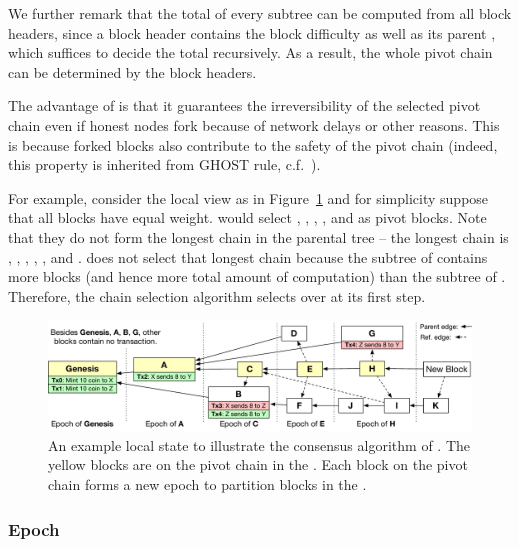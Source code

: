 We further remark that the total  of every subtree can be computed from all block headers, 
since a block header contains the block difficulty as well as its parent , which suffices to decide  the total  recursively.
As a result, the whole pivot chain can be determined by the block headers.


The advantage of  is that it guarantees the
irreversibility of the selected pivot chain even if honest nodes fork because of network delays or other reasons.
This is because forked blocks also contribute
to the safety of the pivot chain (indeed, this property is inherited from GHOST rule, c.f.~\cite{GHOST}).

For example, consider the local view as in Figure~\ref{fig:example} and for simplicity suppose that all blocks have equal weight. 
{\name} would select , ,
, , and  as pivot blocks. 
Note that they do not form the longest chain in the parental tree -- the longest chain is
, , , , , and . 
{\name} does not select that longest chain because the subtree of
 contains more blocks (and hence more total amount of computation) than the subtree of . 
Therefore, the chain selection algorithm selects  over  at its first step.

\begin{figure}
	\centering
	\includegraphics[scale=0.52]{figs/example}
	\caption{An example local \tg state to illustrate the consensus algorithm of
		{\name}. The yellow blocks are on the pivot chain in the \tg. 
		Each block on the pivot chain forms a new epoch to partition
		blocks in the \tg.}
	\label{fig:example}
\end{figure}




\subsubsection{Epoch}

